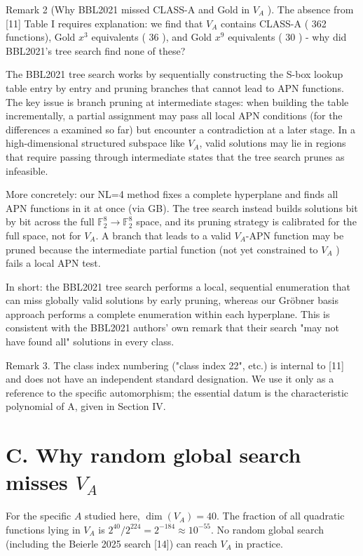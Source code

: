 \documentclass[10pt]{article}
\begin{document}
Remark 2 (Why BBL2021 missed CLASS-A and Gold in $V_{A}$ ). The absence from [11] Table I requires explanation: we find that $V_{A}$ contains CLASS-A ( 362 functions), Gold $x^{3}$ equivalents ( 36 ), and Gold $x^{9}$ equivalents ( 30 ) - why did BBL2021's tree search find none of these?

The BBL2021 tree search works by sequentially constructing the S-box lookup table entry by entry and pruning branches that cannot lead to APN functions. The key issue is branch pruning at intermediate stages: when building the table incrementally, a partial assignment may pass all local APN conditions (for the differences a examined so far) but encounter a contradiction at a later stage. In a high-dimensional structured subspace like $V_{A}$, valid solutions may lie in regions that require passing through intermediate states that the tree search prunes as infeasible.

More concretely: our NL=4 method fixes a complete hyperplane and finds all APN functions in it at once (via GB). The tree search instead builds solutions bit by bit across the full $\mathbb{F}_{2}^{8} \rightarrow \mathbb{F}_{2}^{8}$ space, and its pruning strategy is calibrated for the full space, not for $V_{A}$. A branch that leads to a valid $V_{A}$-APN function may be pruned because the intermediate partial function (not yet constrained to $V_{A}$ ) fails a local APN test.

In short: the BBL2021 tree search performs a local, sequential enumeration that can miss globally valid solutions by early pruning, whereas our Gröbner basis approach performs a complete enumeration within each hyperplane. This is consistent with the BBL2021 authors' own remark that their search "may not have found all" solutions in every class.

Remark 3. The class index numbering ("class index 22", etc.) is internal to [11] and does not have an independent standard designation. We use it only as a reference to the specific automorphism; the essential datum is the characteristic polynomial of A, given in Section IV.

\section*{C. Why random global search misses $V_{A}$}
For the specific $A$ studied here, $\operatorname{dim}\left(V_{A}\right)=40$. The fraction of all quadratic functions lying in $V_{A}$ is $2^{40} / 2^{224}=2^{-184} \approx 10^{-55}$. No random global search (including the Beierle 2025 search [14]) can reach $V_{A}$ in practice.
\end{document}
